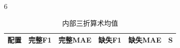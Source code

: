 \begin{PaperTable}{6}

\begin{table}[!htbp]
\centering\caption{内部三折算术均值\label{q2-tab5}}
\begin{tabular}{@{}llllll@{}}
\toprule
\begin{minipage}[b]{\dimexpr 0.240000\linewidth-2.400000\tabcolsep\relax}\raggedright
配置\strut
\end{minipage} & \begin{minipage}[b]{\dimexpr 0.150000\linewidth-1.500000\tabcolsep\relax}\raggedleft
完整F1\strut
\end{minipage} & \begin{minipage}[b]{\dimexpr 0.160000\linewidth-1.600000\tabcolsep\relax}\raggedleft
完整MAE\strut
\end{minipage} & \begin{minipage}[b]{\dimexpr 0.150000\linewidth-1.500000\tabcolsep\relax}\raggedleft
缺失F1\strut
\end{minipage} & \begin{minipage}[b]{\dimexpr 0.160000\linewidth-1.600000\tabcolsep\relax}\raggedleft
缺失MAE\strut
\end{minipage} & \begin{minipage}[b]{\dimexpr 0.140000\linewidth-1.400000\tabcolsep\relax}\raggedleft
S\strut
\end{minipage}\tabularnewline
\midrule


\end{tabular}
\end{table}
\end{PaperTable}

